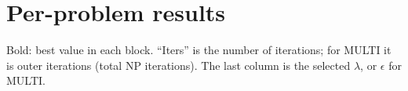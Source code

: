 \appendix
\section{Per-problem results}
\label{app:tables}
Bold: best value in each block. ``Iters'' is the number of iterations; for MULTI it is
outer iterations (total NP iterations). The last column is the selected $\lambda$, or
$\epsilon$ for MULTI.

\begin{table}[!htb]
\centering\scriptsize
{}
\caption{satellite ($R=3$).}
\end{table}
\begin{table}[!htb]
\centering\scriptsize
{}
\caption{ct\_head.}
\end{table}
\begin{table}[!htb]
\centering\scriptsize
{}
\caption{cat.}
\end{table}
\begin{table}[!htb]
\centering\scriptsize
{}
\caption{portrait.}
\end{table}
